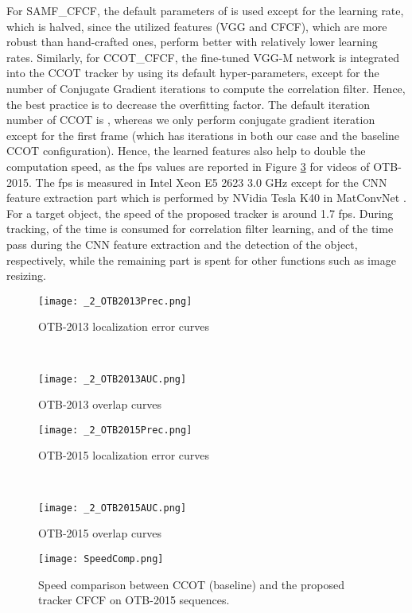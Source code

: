 \documentclass[journal]{IEEEtran}
\begin{document}
For SAMF\_CFCF, the default parameters of \cite{SAMF} is used except for the learning rate, which is halved, since the utilized features (VGG and CFCF), which are more robust than hand-crafted ones, perform better with relatively lower learning rates. Similarly, for CCOT\_CFCF, the fine-tuned VGG-M network is integrated into the CCOT tracker by using its default hyper-parameters, except for the number of Conjugate Gradient iterations to compute the correlation filter. Hence, the best practice is to decrease the overfitting factor. The default iteration number of CCOT is , whereas we only perform  conjugate gradient iteration except for the first frame (which has  iterations in both our case and the baseline CCOT configuration). Hence, the learned features also help to double the computation speed, as the fps values are reported in Figure \ref{Speedy} for  videos of OTB-2015. The fps is measured in Intel Xeon E5 2623 3.0 GHz except for the CNN feature extraction part which is performed by NVidia Tesla K40 in MatConvNet \cite{MatConvNet}. For a  target object, the speed of the proposed tracker is around 1.7 fps. During tracking,  of the time is consumed for correlation filter learning,  and  of the time pass during the CNN feature extraction and the detection of the object, respectively, while the remaining part is spent for other functions such as image resizing.
\begin{figure}
\begin{minipage}{1\linewidth}
\centering
\texttt{[image: \_2\_OTB2013Prec.png]} 
\caption{OTB-2013 localization error curves}
\label{OTB2013Prec}
\end{minipage}
\\
\begin{minipage}{1\linewidth}
\centering
\texttt{[image: \_2\_OTB2013AUC.png]} 
\caption{OTB-2013 overlap curves}
\label{OTB2013AUC}
\end{minipage}
\end{figure}
\normalsize
\begin{figure}
\begin{minipage}{1\linewidth}
\centering
\texttt{[image: \_2\_OTB2015Prec.png]} 
\caption{OTB-2015 localization error curves}
\label{OTB2015Prec}
\end{minipage}
\\
\begin{minipage}{1\linewidth}
\centering
\texttt{[image: \_2\_OTB2015AUC.png]} 
\caption{OTB-2015 overlap curves}
\label{OTB2015AUC}
\end{minipage}
\end{figure}
\begin{figure}
\centering
\texttt{[image: SpeedComp.png]}
\caption{Speed comparison between CCOT (baseline) and the proposed tracker CFCF on OTB-2015 sequences.}
\label{Speedy}
\end{figure}
\end{document}

